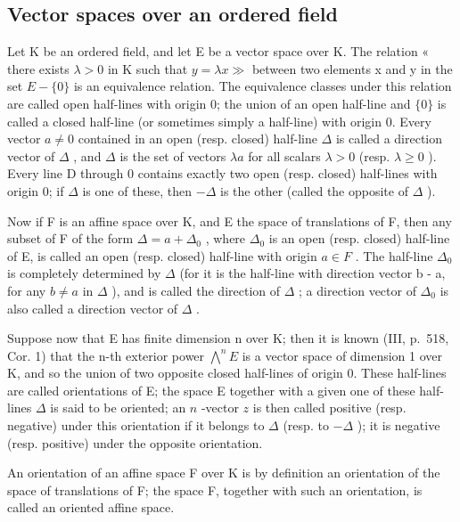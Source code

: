 \subsection{Vector spaces over an ordered field}

Let K be an ordered field, and let E be a vector space over K. The relation « there exists \(\lambda > 0\) in K such that \(y = \lambda x \gg\) between two elements x and y in the set \(E - \{0\}\) is an equivalence relation. The equivalence classes under this relation are called open half-lines with origin 0; the union of an open half-line and \(\{0\}\) is called a closed half-line (or sometimes simply a half-line) with origin 0. Every vector \(a \neq 0\) contained in an open (resp. closed) half-line \(\Delta\) is called a direction vector of \(\Delta\) , and \(\Delta\) is the set of vectors \(\lambda a\) for all scalars \(\lambda > 0\) (resp. \(\lambda \geqslant 0\) ). Every line D through 0 contains exactly two open (resp. closed) half-lines with origin 0; if \(\Delta\) is one of these, then \(-\Delta\) is the other (called the opposite of \(\Delta\) ).

Now if F is an affine space over K, and E the space of translations of F, then any subset of F of the form \(\Delta = a + \Delta_{0}\) , where \(\Delta_{0}\) is an open (resp. closed) half-line of E, is called an open (resp. closed) half-line with origin \(a \in F\) . The half-line \(\Delta_{0}\) is completely determined by \(\Delta\) (for it is the half-line with direction vector b - a, for any \(b \neq a\) in \(\Delta\) ), and is called the direction of \(\Delta\) ; a direction vector of \(\Delta_{0}\) is also called a direction vector of \(\Delta\) .

Suppose now that E has finite dimension n over K; then it is known (III, p.~518, Cor. 1) that the n-th exterior power \(\bigwedge^{n}E\) is a vector space of dimension 1 over K, and so the union of two opposite closed half-lines of origin 0. These half-lines are called orientations of E; the space E together with a given one of these half-lines \(\Delta\) is said to be oriented; an \(n\) -vector \(z\) is then called positive (resp. negative) under this orientation if it belongs to \(\Delta\) (resp. to \(-\Delta\) ); it is negative (resp. positive) under the opposite orientation.

An orientation of an affine space F over K is by definition an orientation of the space of translations of F; the space F, together with such an orientation, is called an oriented affine space.

